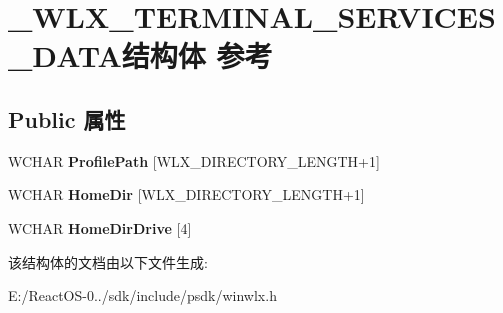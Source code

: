 \hypertarget{struct___w_l_x___t_e_r_m_i_n_a_l___s_e_r_v_i_c_e_s___d_a_t_a}{}\section{\+\_\+\+W\+L\+X\+\_\+\+T\+E\+R\+M\+I\+N\+A\+L\+\_\+\+S\+E\+R\+V\+I\+C\+E\+S\+\_\+\+D\+A\+T\+A结构体 参考}
\label{struct___w_l_x___t_e_r_m_i_n_a_l___s_e_r_v_i_c_e_s___d_a_t_a}
\subsection*{Public 属性}
\begin{DoxyCompactItemize}
\item 
\mbox{\label{struct___w_l_x___t_e_r_m_i_n_a_l___s_e_r_v_i_c_e_s___d_a_t_a_ae121c26203cf1b9466e5fe2a08967421}} 
W\+C\+H\+AR {\bfseries Profile\+Path} \mbox{[}W\+L\+X\+\_\+\+D\+I\+R\+E\+C\+T\+O\+R\+Y\+\_\+\+L\+E\+N\+G\+TH+1\mbox{]}
\item 
\mbox{\label{struct___w_l_x___t_e_r_m_i_n_a_l___s_e_r_v_i_c_e_s___d_a_t_a_ad20a615b1d4037a9dbcca9c604a57a1e}} 
W\+C\+H\+AR {\bfseries Home\+Dir} \mbox{[}W\+L\+X\+\_\+\+D\+I\+R\+E\+C\+T\+O\+R\+Y\+\_\+\+L\+E\+N\+G\+TH+1\mbox{]}
\item 
\mbox{\label{struct___w_l_x___t_e_r_m_i_n_a_l___s_e_r_v_i_c_e_s___d_a_t_a_adfe905f0410d11d8946027f54a5424b9}} 
W\+C\+H\+AR {\bfseries Home\+Dir\+Drive} \mbox{[}4\mbox{]}
\end{DoxyCompactItemize}


该结构体的文档由以下文件生成\+:\begin{DoxyCompactItemize}
\item 
E\+:/\+React\+O\+S-\/0../sdk/include/psdk/winwlx.\+h\end{DoxyCompactItemize}
